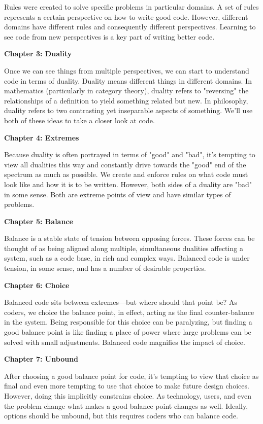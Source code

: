 Rules were created to solve specific problems in particular domains. A set of
rules represents a certain perspective on how to write good code. However,
different domains have different rules and consequently different perspectives.
Learning to see code from new perspectives is a key part of writing better
code.

\textbf{Chapter 3: Duality}

Once we can see things from multiple perspectives, we can start to understand
code in terms of duality.  Duality means different things in different domains.
In mathematics (particularly in category theory), duality refers to "reversing"
the relationships of a definition to yield something related but new. In
philosophy, duality refers to two contrasting yet inseparable aspects of
something. We'll use both of these ideas to take a closer look at code.

\textbf{Chapter 4: Extremes}

Because duality is often portrayed in terms of "good" and "bad", it's tempting
to view all dualities this way and constantly drive towards the "good" end of
the spectrum as much as possible. We create and enforce rules on what code
must look like and how it is to be written. However, both sides of a duality
are "bad" in some sense. Both are extreme points of view and have similar types
of problems.

\textbf{Chapter 5: Balance}

Balance is a stable state of tension between opposing forces. These forces can
be thought of as being aligned along multiple, simultaneous dualities affecting
a system, such as a code base, in rich and complex ways. Balanced code is
under tension, in some sense, and has a number of desirable properties.

\textbf{Chapter 6: Choice}

Balanced code sits between extremes---but where should that point be? As
coders, we choice the balance point, in effect, acting as the final
counter-balance in the system. Being responsible for this choice can be
paralyzing, but finding a good balance point is like finding a place of power
where large problems can be solved with small adjustments. Balanced code
magnifies the impact of choice.

\textbf{Chapter 7: Unbound}

After choosing a good balance point for code, it's tempting to view that choice
as final and even more tempting to use that choice to make future design
choices. However, doing this implicitly constrains choice. As technology,
users, and even the problem change what makes a good balance point changes as
well. Ideally, options should be unbound, but this requires coders who can
balance code. 

